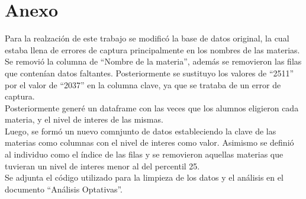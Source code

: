 \documentclass[12pt]{article}
\begin{document}
\section{Anexo}

Para la realzación de este trabajo se modificó la base de datos original, la cual estaba llena de errores de captura principalmente
en los nombres de las materias.\\
Se removió la columna de ``Nombre de la materia'', además se removieron las filas que contenían datos faltantes.
Posteriormente se sustituyo los valores de ``2511'' por el valor de ``2037'' en la columna clave, ya que se trataba de un error de captura.\\
Posteriormente generé un dataframe con las veces que los alumnos eligieron cada materia, y el nivel de interes de las mismas.
\\
Luego, se formó un nuevo comnjunto de datos estableciendo la clave de las materias como columnas con el nivel de interes como valor.
Asimismo se definió al individuo como el índice de las filas y se removieron aquellas materias que tuvieran un nivel de interes menor
al del percentil 25.\\
Se adjunta el código utilizado para la limpieza de los datos y el análisis en el documento ``Análisis Optativas''.
\end{document}
